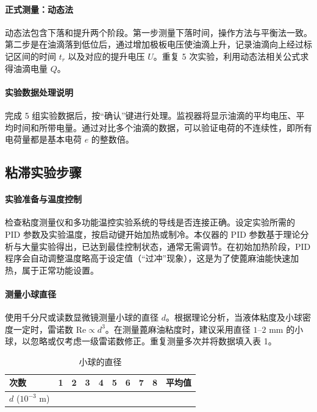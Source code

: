\documentclass[11pt]{article}
\begin{document}
\paragraph{正式测量：动态法}
动态法包含下落和提升两个阶段。第一步测量下落时间，操作方法与平衡法一致。第二步是在油滴落到低位后，通过增加极板电压使油滴上升，记录油滴向上经过标记区间的时间 $t_r$ 以及对应的提升电压 $U$。重复 5 次实验，利用动态法相关公式求得油滴电量 $Q$。

\paragraph{实验数据处理说明}
完成 5 组实验数据后，按“确认”键进行处理。监视器将显示油滴的平均电压、平均时间和所带电量。通过对比多个油滴的数据，可以验证电荷的不连续性，即所有电荷量都是基本电荷 $e$ 的整数倍。

\subsection{粘滞实验步骤}

\paragraph{实验准备与温度控制}
检查粘度测量仪和多功能温控实验系统的导线是否连接正确。设定实验所需的 PID 参数及实验温度，按启动键开始加热或制冷。本仪器的 PID 参数基于理论分析与大量实验得出，已达到最佳控制状态，通常无需调节。在初始加热阶段，PID 程序会自动调整温度略高于设定值（“过冲”现象），这是为了使蓖麻油能快速加热，属于正常功能设置。

\paragraph{测量小球直径}
使用千分尺或读数显微镜测量小球的直径 $d$。根据理论分析，当液体粘度及小球密度一定时，雷诺数 $\text{Re} \propto d^3$。在测量蓖麻油粘度时，建议采用直径 $1\text{--}2\text{ mm}$ 的小球，以忽略或仅考虑一级雷诺数修正。重复测量多次并将数据填入表 1。

\begin{table}[htbp]
\centering
\caption{小球的直径}
\begin{tabular}{lccccccccc}
\toprule
次数 & 1 & 2 & 3 & 4 & 5 & 6 & 7 & 8 & 平均值 \\
\midrule
$d$ ($10^{-3} \text{ m}$) & & & & & & & & & \\
\bottomrule
\end{tabular}
\end{table}
\end{document}
